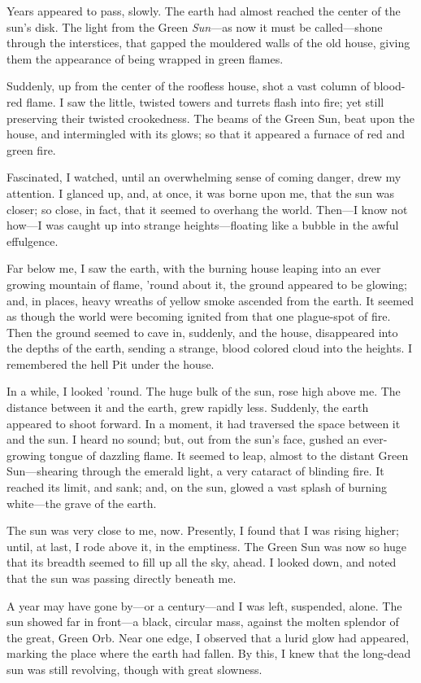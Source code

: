 Years appeared to pass, slowly. The earth had almost reached the center of the sun’s disk. The light from the Green \textit{Sun}---as now it must be called---shone through the interstices, that gapped the mouldered walls of the old house, giving them the appearance of being wrapped in green flames.

Suddenly, up from the center of the roofless house, shot a vast column of blood-red flame. I saw the little, twisted towers and turrets flash into fire; yet still preserving their twisted crookedness. The beams of the Green Sun, beat upon the house, and intermingled with its glows; so that it appeared a furnace of red and green fire.

Fascinated, I watched, until an overwhelming sense of coming danger, drew my attention. I glanced up, and, at once, it was borne upon me, that the sun was closer; so close, in fact, that it seemed to overhang the world. Then---I know not how---I was caught up into strange heights---floating like a bubble in the awful effulgence.

Far below me, I saw the earth, with the burning house leaping into an ever growing mountain of flame, ’round about it, the ground appeared to be glowing; and, in places, heavy wreaths of yellow smoke ascended from the earth. It seemed as though the world were becoming ignited from that one plague-spot of fire. Then the ground seemed to cave in, suddenly, and the house, disappeared into the depths of the earth, sending a strange, blood colored cloud into the heights. I remembered the hell Pit under the house.

In a while, I looked ’round. The huge bulk of the sun, rose high above me. The distance between it and the earth, grew rapidly less. Suddenly, the earth appeared to shoot forward. In a moment, it had traversed the space between it and the sun. I heard no sound; but, out from the sun’s face, gushed an ever-growing tongue of dazzling flame. It seemed to leap, almost to the distant Green Sun---shearing through the emerald light, a very cataract of blinding fire. It reached its limit, and sank; and, on the sun, glowed a vast splash of burning white---the grave of the earth.

The sun was very close to me, now. Presently, I found that I was rising higher; until, at last, I rode above it, in the emptiness. The Green Sun was now so huge that its breadth seemed to fill up all the sky, ahead. I looked down, and noted that the sun was passing directly beneath me.

A year may have gone by---or a century---and I was left, suspended, alone. The sun showed far in front---a black, circular mass, against the molten splendor of the great, Green Orb. Near one edge, I observed that a lurid glow had appeared, marking the place where the earth had fallen. By this, I knew that the long-dead sun was still revolving, though with great slowness.

